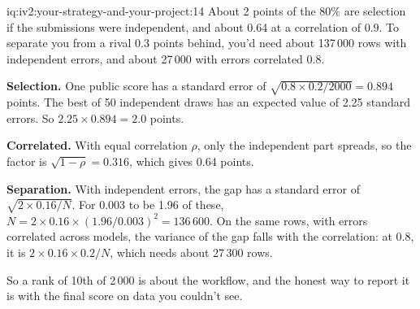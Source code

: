 \begin{solution}{iq:iv2:your-strategy-and-your-project:14}
About 2 points of the 80\% are selection if the submissions were independent, and about 0.64 at a correlation of 0.9. To separate you from a rival 0.3 points behind, you'd need about 137\,000 rows with independent errors, and about 27\,000 with errors correlated 0.8.

\textbf{Selection.} One public score has a standard error of $\sqrt{0.8 \times 0.2/2000} = 0.894$ points. The best of 50 independent draws has an expected value of 2.25 standard errors. So $2.25 \times 0.894 = 2.0$ points.

\textbf{Correlated.} With equal correlation $\rho$, only the independent part spreads, so the factor is $\sqrt{1 - \rho} = 0.316$, which gives 0.64 points.

\textbf{Separation.} With independent errors, the gap has a standard error of $\sqrt{2 \times 0.16/N}$. For $0.003$ to be 1.96 of these, $N = 2 \times 0.16 \times (1.96/0.003)^2 = 136\,600$. On the same rows, with errors correlated across models, the variance of the gap falls with the correlation: at 0.8, it is $2 \times 0.16 \times 0.2/N$, which needs about 27\,300 rows.

So a rank of 10th of 2\,000 is about the workflow, and the honest way to report it is with the final score on data you couldn't see.

\end{solution}

